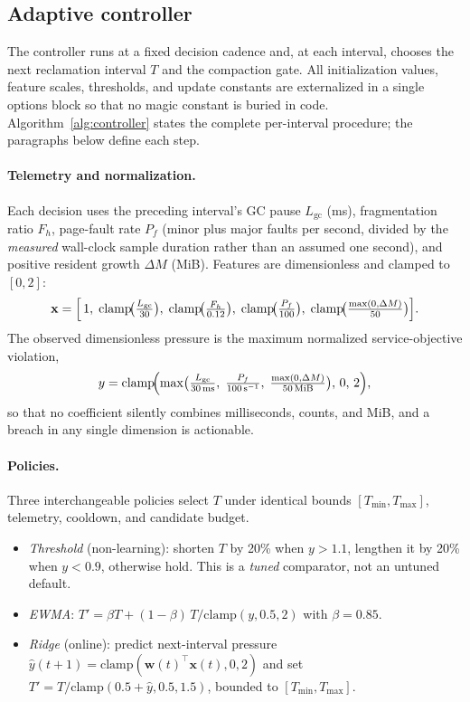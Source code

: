 \documentclass[acmsmall,screen]{acmart}
\begin{document}
\subsection{Adaptive controller}
\label{sec:controller}

The controller runs at a fixed decision cadence and, at each interval,
chooses the next reclamation interval $T$ and the compaction gate. All
initialization values, feature scales, thresholds, and update constants are
externalized in a single options block so that no magic constant is buried
in code. Algorithm~\ref{alg:controller} states the complete per-interval
procedure; the paragraphs below define each step.

\paragraph{Telemetry and normalization.}
Each decision uses the preceding interval's GC pause
$L_{\mathrm{gc}}$ (ms), fragmentation ratio $F_h$, page-fault rate $P_f$
(minor plus major faults per second, divided by the \emph{measured}
wall-clock sample duration rather than an assumed one second), and positive
resident growth $\Delta M$ (MiB). Features are dimensionless and clamped to
$[0,2]$:
\begin{equation}
\mathbf{x} = \Bigl[\,1,\;
  \mathrm{clamp}\!\bigl(\tfrac{L_{\mathrm{gc}}}{30}\bigr),\;
  \mathrm{clamp}\!\bigl(\tfrac{F_h}{0.12}\bigr),\;
  \mathrm{clamp}\!\bigl(\tfrac{P_f}{100}\bigr),\;
  \mathrm{clamp}\!\bigl(\tfrac{\max(0,\Delta M)}{50}\bigr)\Bigr].
\end{equation}
The observed dimensionless pressure is the maximum normalized
service-objective violation,
\begin{equation}
\label{eq:pressure}
y = \mathrm{clamp}\!\Bigl(
  \max\bigl(\tfrac{L_{\mathrm{gc}}}{30\,\text{ms}},\;
            \tfrac{P_f}{100\,\text{s}^{-1}},\;
            \tfrac{\max(0,\Delta M)}{50\,\text{MiB}}\bigr),\,0,\,2\Bigr),
\end{equation}
so that no coefficient silently combines milliseconds, counts, and MiB, and
a breach in any single dimension is actionable.

\paragraph{Policies.}
Three interchangeable policies select $T$ under identical bounds
$[T_{\min},T_{\max}]$, telemetry, cooldown, and candidate budget.
\begin{itemize}
  \item \emph{Threshold} (non-learning): shorten $T$ by 20\% when
  $y>1.1$, lengthen it by 20\% when $y<0.9$, otherwise hold. This is a
  \emph{tuned} comparator, not an untuned default.
  \item \emph{EWMA}: $T' = \beta T + (1-\beta)\,T/\mathrm{clamp}(y,0.5,2)$
  with $\beta = 0.85$.
  \item \emph{Ridge} (online): predict next-interval pressure
  $\hat{y}(t{+}1) = \mathrm{clamp}(\mathbf{w}(t)^{\!\top}\mathbf{x}(t),0,2)$
  and set $T' = T/\mathrm{clamp}(0.5+\hat{y},0.5,1.5)$, bounded to
  $[T_{\min},T_{\max}]$.
\end{itemize}
\end{document}
